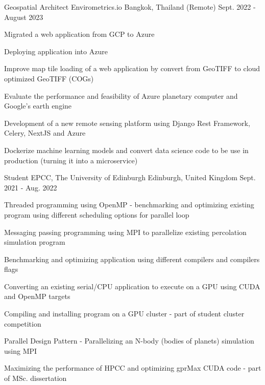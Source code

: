 \begin{cventries}
  \cventry
    {Geospatial Architect} %
    {Envirometrics.io} %
    {Bangkok, Thailand (Remote)} %
    {Sept. 2022 - August 2023} %
    {
      \begin{cvitems} %
      \item {Migrated a web application from GCP to Azure}
      \item {Deploying application into Azure}
      \item {Improve map tile loading of a web application by convert from GeoTIFF to cloud optimized GeoTIFF (COGs)}
      \item {Evaluate the performance and feasibility of Azure planetary computer and Google's earth engine}
      \item {Development of a new remote sensing platform using Django Rest Framework, Celery, NextJS and Azure}
      \item {Dockerize machine learning models and convert data science code to be use in production (turning it into a microservice)}
      \end{cvitems}
    }

  \cventry
    {Student} %
    {EPCC, The University of Edinburgh} %
    {Edinburgh, United Kingdom} %
    {Sept. 2021 - Aug. 2022} %
    {
      \begin{cvitems} %
        \item {Threaded programming using OpenMP - benchmarking and optimizing existing program using different scheduling options for parallel loop}
        \item {Messaging passing programming using MPI to parallelize existing percolation simulation program}
        \item {Benchmarking and optimizing application using different compilers and compilers flags}
        \item {Converting an existing serial/CPU application to execute on a GPU using CUDA and OpenMP targets}
        \item {Compiling and installing program on a GPU cluster - part of student cluster competition}
        \item {Parallel Design Pattern - Parallelizing an N-body (bodies of planets) simulation using MPI}
        \item {Maximizing the performance of HPCC and optimizing gprMax CUDA code - part of MSc. dissertation}
      \end{cvitems}
    }


\end{cventries}
